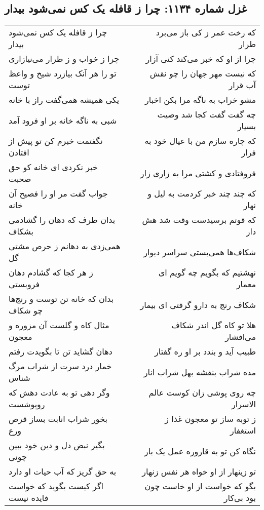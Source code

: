 \begin{center}
\section*{غزل شماره ۱۱۳۴: چرا ز قافله یک کس نمی‌شود بیدار}
\label{sec:1134}
\begin{longtable}{l p{0.5cm} r}
چرا ز قافله یک کس نمی‌شود بیدار
&&
که رخت عمر ز کی باز می‌برد طرار
\\
چرا ز خواب و ز طرار می‌نیازاری
&&
چرا از او که خبر می‌کند کنی آزار
\\
تو را هر آنک بیازرد شیخ و واعظ توست
&&
که نیست مهر جهان را چو نقش آب قرار
\\
یکی همیشه همی‌گفت راز با خانه
&&
مشو خراب به ناگه مرا بکن اخبار
\\
شبی به ناگه خانه بر او فرود آمد
&&
چه گفت گفت کجا شد وصیت بسیار
\\
نگفتمت خبرم کن تو پیش از افتادن
&&
که چاره سازم من با عیال خود به فرار
\\
خبر نکردی ای خانه کو حق صحبت
&&
فروفتادی و کشتی مرا به زاری زار
\\
جواب گفت مر او را فصیح آن خانه
&&
که چند چند خبر کردمت به لیل و نهار
\\
بدان طرف که دهان را گشادمی بشکاف
&&
که قوتم برسیدست وقت شد هش دار
\\
همی‌زدی به دهانم ز حرص مشتی گل
&&
شکاف‌ها همی‌بستی سراسر دیوار
\\
ز هر کجا که گشادم دهان فروبستی
&&
نهشتیم که بگویم چه گویم ای معمار
\\
بدان که خانه تن توست و رنج‌ها چو شکاف
&&
شکاف رنج به دارو گرفتی ای بیمار
\\
مثال کاه و گلست آن مزوره و معجون
&&
هلا تو کاه گل اندر شکاف می‌افشار
\\
دهان گشاید تن تا بگویدت رفتم
&&
طبیب آید و بندد بر او ره گفتار
\\
خمار درد سرت از شراب مرگ شناس
&&
مده شراب بنفشه بهل شراب انار
\\
وگر دهی تو به عادت دهش که روپوشست
&&
چه روی پوشی زان کوست عالم الاسرار
\\
بخور شراب انابت بساز قرص ورع
&&
ز توبه ساز تو معجون غذا ز استغفار
\\
بگیر نبض دل و دین خود ببین چونی
&&
نگاه کن تو به قاروره عمل یک بار
\\
به حق گریز که آب حیات او دارد
&&
تو زینهار از او خواه هر نفس زنهار
\\
اگر کیست بگوید که خواست فایده نیست
&&
بگو که خواست از او خاست چون بود بی‌کار
\\

\end{longtable}
\end{center}
